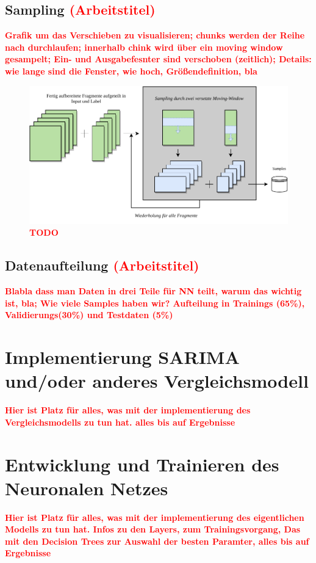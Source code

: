 \documentclass[
12pt, %
toc=listofnumbered, %
toc=chapterentrydotfill, %
numbers=noenddot, %
captions=tableheading, %
]{scrreprt}
\let\Oldsection\section
\renewcommand{\section}{\FloatBarrier\Oldsection}
\let\Oldsubsection\subsection
\renewcommand{\subsection}{\FloatBarrier\Oldsubsection}
\newcommand{\highlight}[1]{\textbf{\textcolor{red}{#1}}}
\begin{document}
\subsection{Sampling \highlight{(Arbeitstitel)}}
\highlight{Grafik um das Verschieben zu visualisieren; chunks werden der Reihe nach durchlaufen; 
innerhalb chink wird über ein moving window gesampelt; Ein- und Ausgabefesnter sind verschoben (zeitlich); 
Details: wie lange sind die Fenster, wie hoch, Größendefinition, bla}


\begin{figure}[tph]
	\begin{center}
		\includegraphics[]{./images/sampling.pdf}
		\caption{\highlight{{TODO}}}
		\label{fig:sampling}
	\end{center}
\end{figure}

\subsection{Datenaufteilung \highlight{(Arbeitstitel)}}
\highlight{Blabla dass man Daten in drei Teile für NN teilt, warum das wichtig ist, bla; 
Wie viele Samples haben wir? Aufteilung in Trainings (65\%), Validierungs(30\%) und Testdaten (5\%)}

\section{Implementierung SARIMA und/oder anderes Vergleichsmodell}
\highlight{Hier ist Platz für alles, was mit der implementierung des Vergleichsmodells zu tun hat. 
alles bis auf Ergebnisse}

\section{Entwicklung und Trainieren des Neuronalen Netzes}
\highlight{Hier ist Platz für alles, was mit der implementierung des eigentlichen Modells zu tun hat. 
Infos zu den Layers, zum Trainingsvorgang, Das mit den Decision Trees zur Auswahl der besten Paramter, 
alles bis auf Ergebnisse}
\end{document}
